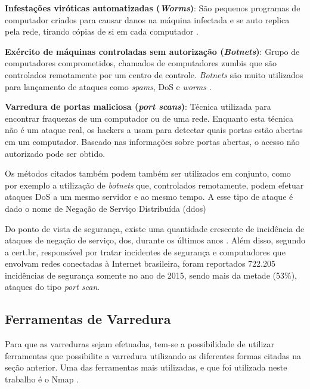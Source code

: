 \textbf{Infestações viróticas automatizadas (\textit{Worms})}:
São pequenos programas de computador criados para causar danos na máquina infectada e se auto replica pela rede, tirando cópias de si em cada computador \cite{Sperotto:2010}.
    
\textbf{Exército de máquinas controladas sem autorização (\textit{Botnets})}:
Grupo de computadores comprometidos, chamados de computadores zumbis que são controlados remotamente por um centro de controle. \textit{Botnets} são muito utilizados para lançamento de ataques  como \textit{spams}, DoS e \textit{worms} \cite{Sperotto:2010}.
    
\textbf{Varredura de portas maliciosa (\textit{port scans})}:
Técnica utilizada para encontrar fraquezas de um computador ou de uma rede. Enquanto esta técnica não é um ataque real, os hackers a usam para detectar quais portas estão abertas em um computador. Baseado nas informações sobre portas abertas, o acesso não autorizado pode ser obtido.

Os métodos citados também podem também ser utilizados em conjunto, como por exemplo a utilização de \textit{botnets} que, controlados remotamente, podem efetuar ataques DoS a um mesmo servidor e ao mesmo tempo. A esse tipo de ataque é dado o nome de Negação de Serviço Distribuída (\gls{ddos})

Do ponto de vista de segurança, existe uma quantidade crescente de incidência de ataques de negação de serviço, \gls{dos}, durante os últimos anos \cite{Seeber:2015}. Além disso, segundo a \gls{cert.br}, responsável por tratar incidentes de segurança e computadores que envolvam redes conectadas à Internet brasileira, foram reportados 722.205 incidências de segurança somente no ano de 2015, sendo mais da metade (53\%), ataques do tipo \textit{port scan}.



\subsection{Ferramentas de Varredura}

Para que as varreduras sejam efetuadas, tem-se a possibilidade de utilizar ferramentas que possibilite a varredura utilizando as diferentes formas citadas na seção anterior. Uma das ferramentas mais utilizadas, e que foi utilizada neste trabalho é o Nmap \cite{Lyon:2009}.


